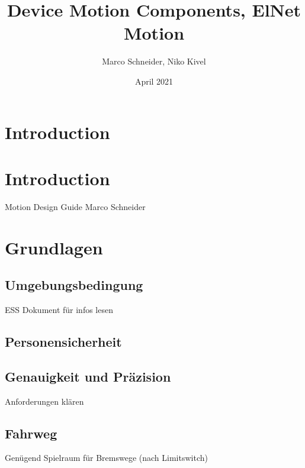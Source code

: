 

% 


\section{Introduction}

\title{Device Motion Components, ElNet Motion}
\author{Marco Schneider, Niko Kivel}
\date{April 2021}



\maketitle

\section{Introduction}

Motion Design Guide
Marco Schneider

\section{Grundlagen}

\subsection{Umgebungsbedingung}
ESS Dokument für infos lesen

\subsection{Personensicherheit}


\subsection{Genauigkeit und Präzision}
Anforderungen klären

\subsection{Fahrweg}
Genügend Spielraum für Bremswege (nach Limitswitch)

